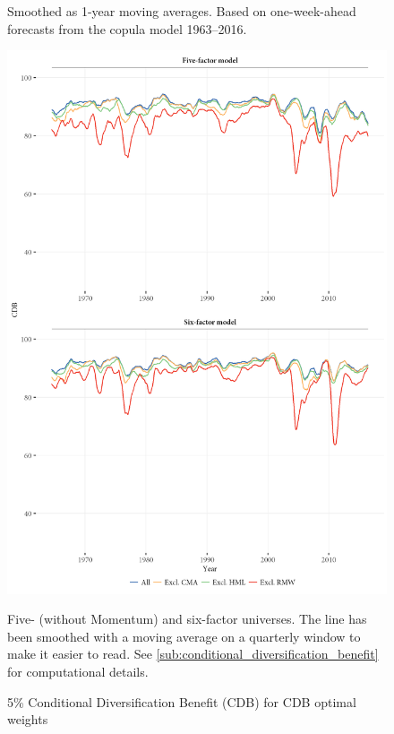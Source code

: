 \begin{figure}[htbp]
  \begin{longcaption}
    Smoothed as 1-year moving averages. Based on one-week-ahead forecasts from the copula model 1963--2016.
  \end{longcaption}
\end{figure}

\begin{figure}[!ht]
  \centering
  \footnotesize
  \includegraphics[width = \textwidth]{graphics/cdb/CDB.png}
  \caption{5\% Conditional Diversification Benefit (CDB) for CDB optimal weights}

  \begin{longcaption}
    Five- (without Momentum) and six-factor universes. The line has been smoothed with a moving average on a quarterly window to make it easier to read. See \autoref{sub:conditional_diversification_benefit} for computational details.
  \end{longcaption}
  \label{fig:cdb_cdb}
\end{figure}

